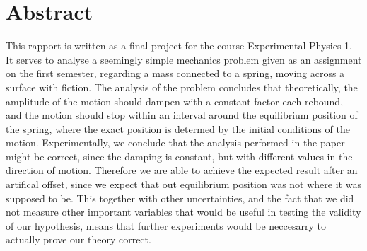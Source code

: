 \maketitle
%
\clearpage
\chapter{Abstract}
This rapport is written as a final project for the course Experimental Physics 1. 
It serves to analyse a seemingly simple mechanics problem given as an assignment on the first semester, regarding a mass connected to a spring, moving across a surface with fiction.
The analysis of the problem concludes that theoretically, the amplitude of the motion should dampen with a constant factor each rebound, and the motion should stop within an interval around the equilibrium position of the spring, 
where the exact position is determed by the initial conditions of the motion.
Experimentally, we conclude that the analysis performed in the paper might be correct, since the damping is constant, but with different values in the direction of motion.
Therefore we are able to achieve the expected result after an artifical offset, since we expect that out equilibrium position was not where it was supposed to be. 
This together with other uncertainties, and the fact that we did not measure other important variables that would be useful in testing the validity of our hypothesis, 
means that further experiments would be neccesarry to actually prove our theory correct.